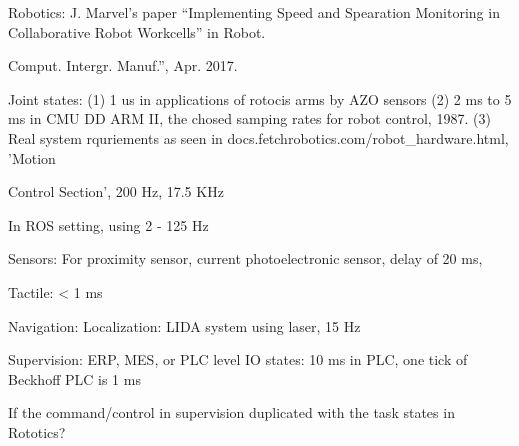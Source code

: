    
Robotics:
J. Marvel's paper ``Implementing Speed and Spearation Monitoring in Collaborative Robot Workcells'' in Robot. 

Comput. Intergr. Manuf.'', Apr. 2017.

Joint states: (1) 1 us in applications of rotocis arms by AZO sensors
		(2) 2 ms to 5 ms in CMU DD ARM II, the chosed samping rates for robot control, 1987.
		(3) Real system rquriements as seen in docs.fetchrobotics.com/robot_hardware.html, 'Motion 

Control Section', 200 Hz, 17.5 KHz

In ROS setting, using 2 - 125 Hz

Sensors:
For proximity sensor, current photoelectronic sensor, delay of 20 ms, 

Tactile: < 1 ms


Navigation:
Localization: 
LIDA system using laser, 15 Hz

Supervision: ERP, MES, or PLC level
IO states: 10 ms in PLC, one tick of Beckhoff PLC is 1 ms

If the command/control in supervision duplicated with the task states in Rototics?
	